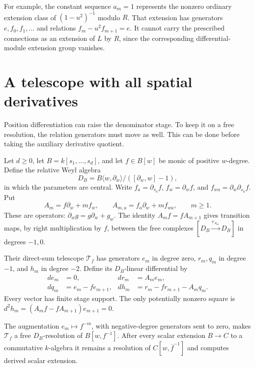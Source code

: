 For example, the constant sequence $a_m=1$ represents the
nonzero ordinary extension class of $(1-u^2)^{-1}$ modulo
$R$. That extension has generators $e,f_0,f_1,\ldots$ and
relations $f_m-u^2f_{m+1}=e$. It cannot carry the prescribed
connections as an extension of $L$ by $R$, since the
corresponding differential-module extension group vanishes.

\section{A telescope with all spatial derivatives}
\label{cbc:hc:spatial}

Position differentiation can raise the denominator stage. To keep
it on a free resolution, the relation generators must move
as well. This can be done before taking the auxiliary
derivative quotient.

Let $d\geq0$, let $B=k[s_1,\ldots,s_d]$, and let $f\in B[w]$ be monic
of positive $w$-degree. Define the relative Weyl algebra
\[
 D_B=B\langle w,\partial_w\rangle/([\partial_w,w]-1),
\]
in which the parameters are central. Write $f_a=\partial_{s_a}f$,
$f_w=\partial_wf$, and $f_{wa}=\partial_w\partial_{s_a}f$.
Put
\begin{equation}\label{cbc:hc:weyl-operators}
 A_m=f\partial_w+mf_w,\qquad
 A_{m,a}=f_a\partial_w+mf_{wa},\qquad m\geq1.
\end{equation}
These are operators: $\partial_wg=g\partial_w+g_w$.
The identity $A_mf=fA_{m+1}$ gives transition maps, by
right multiplication by $f$, between the free complexes
$[D_B\xrightarrow{r_{A_m}}D_B]$ in degrees $-1,0$.

Their direct-sum telescope $\mathcal T_f$ has generators
$e_m$ in degree zero, $r_m,q_m$ in degree $-1$, and $h_m$
in degree $-2$. Define its $D_B$-linear differential by
\begin{equation}\label{cbc:hc:spatial-differential}
 \begin{aligned}
 de_m&=0,& dr_m&=A_me_m,\\
 dq_m&=e_m-fe_{m+1},&
 dh_m&=r_m-fr_{m+1}-A_mq_m.
 \end{aligned}
\end{equation}
Every vector has finite stage support. The only potentially
nonzero square is
$d^2h_m=(A_mf-fA_{m+1})e_{m+1}=0$.

\begin{lemma}\label{cbc:hc:localization-telescope}
The augmentation $e_m\mapsto f^{-m}$, with negative-degree
generators sent to zero, makes $\mathcal T_f$ a free
$D_B$-resolution of $B[w,f^{-1}]$. After every scalar
extension $B\to C$ to a commutative $k$-algebra it remains
a resolution of $C[w,\overline f^{-1}]$ and computes
derived scalar extension.
\end{lemma}

